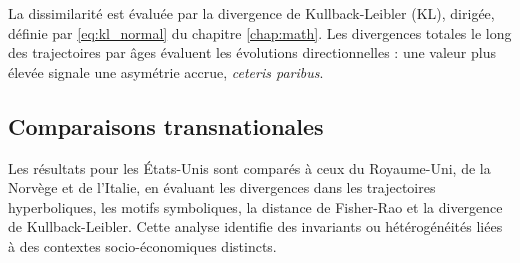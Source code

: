 La dissimilarité est évaluée par la divergence de Kullback-Leibler (KL), dirigée, définie par \eqref{eq:kl_normal} du chapitre \ref{chap:math}. Les divergences totales le long des trajectoires par âges évaluent les évolutions directionnelles : une valeur plus élevée signale une asymétrie accrue, \emph{ceteris paribus}.

\subsection{Comparaisons transnationales}

Les résultats pour les États-Unis sont comparés à ceux du Royaume-Uni, de la Norvège et de l'Italie, en évaluant les divergences dans les trajectoires hyperboliques, les motifs symboliques, la distance de Fisher-Rao et la divergence de Kullback-Leibler. Cette analyse identifie des invariants ou hétérogénéités liées à des contextes socio-économiques distincts.